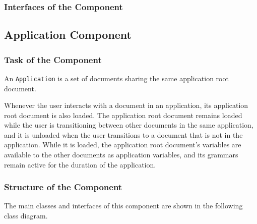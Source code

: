\documentclass[11pt,a4paper]{article}
\begin{document}
\subsubsection{Interfaces of the Component}

\subsection{Application Component}

\subsubsection{Task of the Component}

An \texttt{Application} is a set of documents sharing the same 
application root document.

Whenever the user interacts with a document in an application, its
application root document is also loaded. The application root document
remains loaded while the user is transitioning between other documents in the
same application, and it is unloaded when the user transitions to a document
that is not in the application. While it is loaded, the application root
document's variables are available to the other documents as application
variables, and its grammars remain active for the duration of the
application.

\subsubsection{Structure of the Component}

The main classes and interfaces of this component are shown in the following
class diagram.
\end{document}

